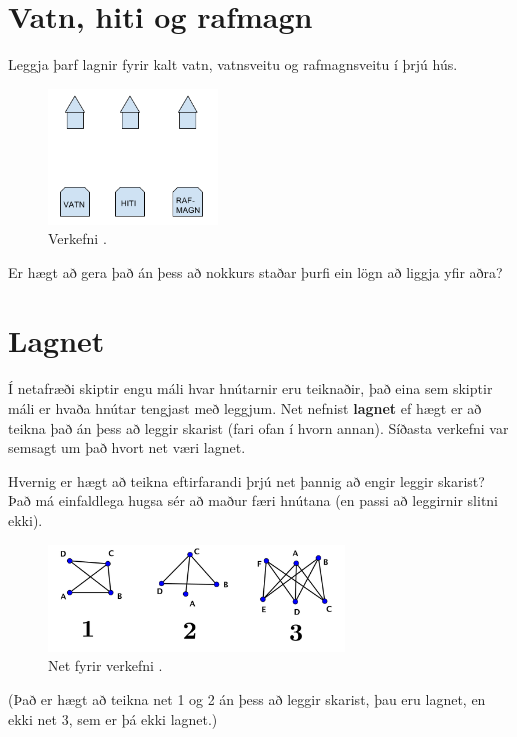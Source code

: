 \documentclass[b5paper,12pt]{book}
\renewcommand*\thesection{\arabic{section}}
\begin{document}
\section{Vatn, hiti og rafmagn}
\label{sec:vatnhiti}
Leggja þarf lagnir fyrir kalt vatn, vatnsveitu og rafmagnsveitu í þrjú hús.

\begin{figure}[h]
  \includegraphics[width=0.4\textwidth, center]{Vatnhiti.png}
  \caption*{Verkefni \thesection{}.}
\end{figure}

\noindent 
Er hægt að gera það án þess að nokkurs staðar þurfi ein lögn að liggja yfir aðra?

\section{Lagnet}
Í netafræði skiptir engu máli hvar hnútarnir eru teiknaðir, það eina sem skiptir máli er hvaða hnútar tengjast með leggjum. Net nefnist \textbf{lagnet} ef hægt er að teikna það án þess að leggir skarist (fari ofan í hvorn annan). Síðasta verkefni var semsagt um það hvort net væri lagnet.

Hvernig er hægt að teikna eftirfarandi þrjú net þannig að engir leggir skarist? Það má einfaldlega hugsa sér að maður færi hnútana (en passi að leggirnir slitni ekki).
\begin{figure}[h]
  \includegraphics[width=0.7\textwidth, center]{3Lagnet.png}
  \caption*{Net fyrir verkefni \thesection{}.}
\end{figure}

(Það er hægt að teikna net 1 og 2 án þess að leggir skarist, þau eru lagnet, en ekki net 3, sem er þá ekki lagnet.)
\end{document}
